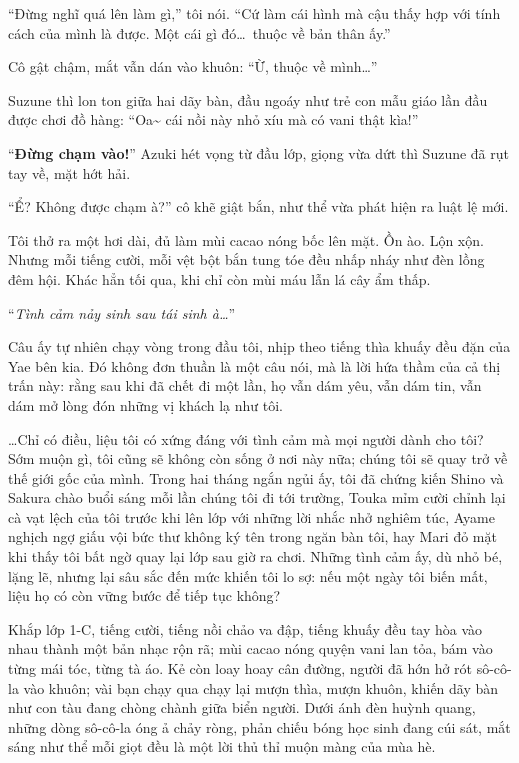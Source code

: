 \documentclass[../main.tex]{subfiles}
\begin{document}
``Đừng nghĩ quá lên làm gì,'' tôi nói. ``Cứ làm cái hình mà cậu thấy hợp với tính cách của mình là được. Một cái gì đó\dots\ thuộc về bản thân ấy.''

Cô gật chậm, mắt vẫn dán vào khuôn: ``Ừ, thuộc về mình\dots''

Suzune thì lon ton giữa hai dãy bàn, đầu ngoáy như trẻ con mẫu giáo lần đầu được chơi đồ hàng: ``Oa\~{} cái nồi này nhỏ xíu mà có vani thật kìa!''

``\textbf{Đừng chạm vào!}'' Azuki hét vọng từ đầu lớp, giọng vừa dứt thì Suzune đã rụt tay về, mặt hớt hải.

``Ể? Không được chạm à?'' cô khẽ giật bắn, như thể vừa phát hiện ra luật lệ mới.

Tôi thở ra một hơi dài, đủ làm mùi cacao nóng bốc lên mặt. Ồn ào. Lộn xộn. Nhưng mỗi tiếng cười, mỗi vệt bột bắn tung tóe đều nhấp nháy như đèn lồng đêm hội. Khác hẳn tối qua, khi chỉ còn mùi máu lẫn lá cây ẩm thấp.

``\textit{Tình cảm nảy sinh sau tái sinh à\dots}''

Câu ấy tự nhiên chạy vòng trong đầu tôi, nhịp theo tiếng thìa khuấy đều đặn của Yae bên kia. Đó không đơn thuần là một câu nói, mà là lời hứa thầm của cả thị trấn này: rằng sau khi đã chết đi một lần, họ vẫn dám yêu, vẫn dám tin, vẫn dám mở lòng đón những vị khách lạ như tôi.

\dots Chỉ có điều, liệu tôi có xứng đáng với tình cảm mà mọi người dành cho tôi? Sớm muộn gì, tôi cũng sẽ không còn sống ở nơi này nữa; chúng tôi sẽ quay trở về thế giới gốc của mình. Trong hai tháng ngắn ngủi ấy, tôi đã chứng kiến Shino và Sakura chào buổi sáng mỗi lần chúng tôi đi tới trường, Touka mỉm cười chỉnh lại cà vạt lệch của tôi trước khi lên lớp với những lời nhắc nhở nghiêm túc, Ayame nghịch ngợ giấu vội bức thư không ký tên trong ngăn bàn tôi, hay Mari đỏ mặt khi thấy tôi bất ngờ quay lại lớp sau giờ ra chơi. Những tình cảm ấy, dù nhỏ bé, lặng lẽ, nhưng lại sâu sắc đến mức khiến tôi lo sợ: nếu một ngày tôi biến mất, liệu họ có còn vững bước để tiếp tục không?

\ct

Khắp lớp 1-C, tiếng cười, tiếng nồi chảo va đập, tiếng khuấy đều tay hòa vào nhau thành một bản nhạc rộn rã; mùi cacao nóng quyện vani lan tỏa, bám vào từng mái tóc, từng tà áo. Kẻ còn loay hoay cân đường, người đã hớn hở rót sô-cô-la vào khuôn; vài bạn chạy qua chạy lại mượn thìa, mượn khuôn, khiến dãy bàn như con tàu đang chòng chành giữa biển người. Dưới ánh đèn huỳnh quang, những dòng sô-cô-la óng ả chảy ròng, phản chiếu bóng học sinh đang cúi sát, mắt sáng như thể mỗi giọt đều là một lời thủ thỉ muộn màng của mùa hè.
\end{document}
